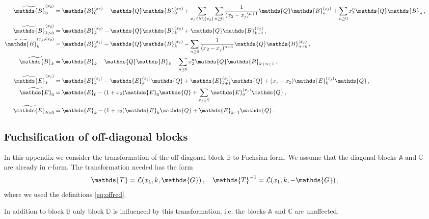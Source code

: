 \documentclass[12pt]{article}
\numberwithin{equation}{section}
\numberwithin{figure}{section}
\newcommand{\A}{\mathds{A}}
\newcommand{\B}{\mathds{B}}
\newcommand{\C}{\mathds{C}}
\newcommand{\D}{\mathds{D}}
\newcommand{\E}{\mathds{E}}
\newcommand{\G}{\mathds{G}}
\newcommand{\T}{\mathds{T}}
\newcommand{\Q}{\mathds{Q}}
\begin{document}
      \begin{align*}
        \widetilde \B^{(x_2)}_0 &=
          \B^{(x_2)}_0 - \Q \B^{(x_2)}_0
          +
          \sum\limits_{x_j \in S \backslash\{x_2\}} 
          \sum\limits_{n\geq0} \frac1{(x_2-x_j)^{n+1}}
          \Q \B^{(x_j)}_n  
          + 
          \sum\limits_{n\geq0} 
          x_2^n 
          \Q \B_n\,,
        \\
        \widetilde \B^{(x_2)}_{k>0} &=
          \B^{(x_2)}_k - \Q \B^{(x_2)}_k 
          +
          \Q \B^{(x_2)}_{k-1}\,, 
        \\
        \widetilde \B^{(x_j\neq x_2)}_k &=
          \B^{(x_j)}_k - \Q \B^{(x_j)}_k 
          - 
          \sum\limits_{n\geq0} 
          \frac1{(x_2-x_j)^{n+1}} 
          \Q \B^{(x_j)}_{n+k}\,, 
        \\
        \widetilde \B_k &=
          \B_k - \Q \B_k 
          +
          \sum\limits_{n\geq0} 
          x_2^n 
          \Q \B_{k+n+1} \,,
        \\
        \widetilde \E^{(x_j)}_k &=
          \E^{(x_j)}_k - \E^{(x_j)}_k \Q 
          +
          \E^{(x_j)}_{k+1} \Q 
          +
          (x_j-x_2)
          \E^{(x_j)}_k \Q \,,  
        \\
        \widetilde \E_0 &=
          \E_0 - (1+x_2) \E_0 \Q 
          +
          \sum\limits_{x_j \in S} 
          \E^{(x_j)}_0 \Q \,, \\
        \widetilde \E_{k>0} &=
          \E_k - (1+x_2)\E_k \Q 
          +
          \E_{k-1} \Q\,. 
      \end{align*}
    \subsection{Fuchsification of off-diagonal blocks}
      In this appendix we consider the transformation of the off-diagonal block $\B$ to Fuchsian form.
      We assume that the diagonal blocks $\A$ and $\C$ are already in $\epsilon$-form.
      The transformation needed has the form
      \begin{equation} \label{eq:lefttrans}
        \T = {\cal L}(x_1,k,\G)\,, \quad
        \T^{-1} = {\cal L}(x_1,k,-\G)\,,
      \end{equation}
      where we used the definitions \eqref{eq:offred}. 

      In addition to block $\B$ only block $\D$ is influenced by this transformation, i.e. the blocks $\A$ and $\C$ are unaffected.
      
\end{document}
